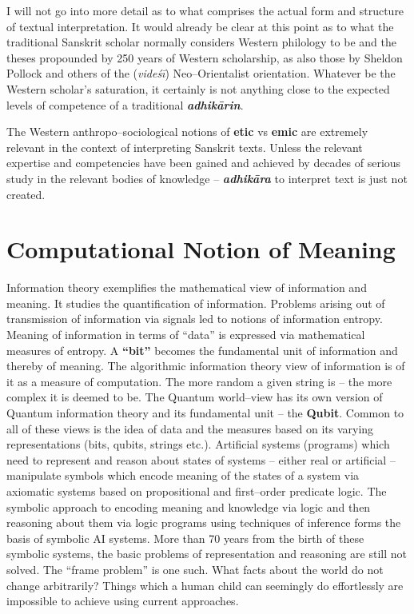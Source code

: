 I will not go into more detail as to what comprises the actual form and structure of textual interpretation. It would already be clear at this point as to what the traditional Sanskrit scholar normally considers Western philology to be and the theses propounded by 250 years of Western scholarship, as also those by Sheldon Pollock and others of the (\textit{videśī}) Neo–Orientalist orientation. Whatever be the Western scholar’s saturation, it certainly is not anything close to the expected levels of competence of a traditional \textbf{\textit{adhikārin}}.

The Western anthropo–sociological notions of \textbf{etic} vs \textbf{emic} are extremely relevant in the context of interpreting Sanskrit texts. Unless the relevant expertise and competencies have been gained and achieved by decades of serious study in the relevant bodies of knowledge – \textbf{\textit{adhikāra}} to interpret text is just not created.


\section*{Computational Notion of Meaning}

\vskip -6.5pt

Information theory exemplifies the mathematical view of information and meaning. It studies the quantification of information. Problems arising out of transmission of information via signals led to notions of information entropy. Meaning of information in terms of “data” is expressed via mathematical measures of entropy. A \textbf{“bit”} becomes the fundamental unit of information and thereby of meaning. The algorithmic information theory view of information is of it as a measure of computation. The more random a given string is – the more complex it is deemed to be. The Quantum world–view has its own version of Quantum information theory and its fundamental unit – the \textbf{Qubit}. Common to all of these views is the idea of data and the measures based on its varying representations (bits, qubits, strings etc.). Artificial systems (programs) which need to represent and reason about states of systems – either real or artificial – manipulate symbols which encode meaning of the states of a system via axiomatic systems based on propositional and first–order predicate logic. The symbolic approach to encoding meaning and knowledge via logic and then reasoning about them via logic programs using techniques of inference forms the basis of symbolic AI systems. More than 70 years from the birth of these symbolic systems, the basic problems of representation and reasoning are still not solved. The “frame problem” is one such. What facts about the world do not change arbitrarily? Things which a human child can seemingly do effortlessly are impossible to achieve using current approaches.

